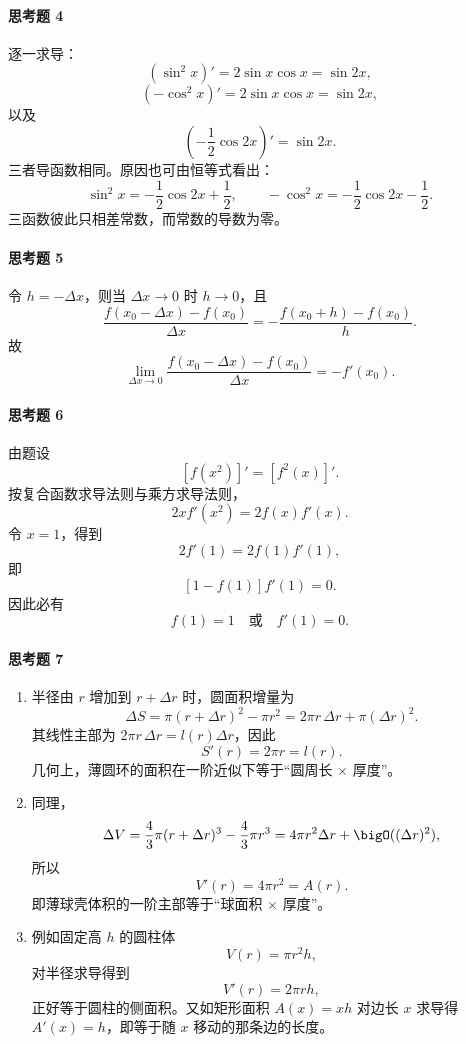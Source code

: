 \paragraph{思考题 4}
\begin{xsolution}
逐一求导：
\[
  (\sin^2x)'=2\sin x\cos x=\sin2x,
\]
\[
  (-\cos^2x)'=2\sin x\cos x=\sin2x,
\]
以及
\[
  \left(-\frac12\cos2x\right)'=\sin2x.
\]
三者导函数相同。原因也可由恒等式看出：
\[
  \sin^2x=-\frac12\cos2x+\frac12,
  \qquad
  -\cos^2x=-\frac12\cos2x-\frac12.
\]
三函数彼此只相差常数，而常数的导数为零。
\end{xsolution}

\paragraph{思考题 5}
\begin{xsolution}
令 $h=-\Delta x$，则当 $\Delta x\to0$ 时 $h\to0$，且
\[
  \frac{f(x_0-\Delta x)-f(x_0)}{\Delta x}
  =-\frac{f(x_0+h)-f(x_0)}h.
\]
故
\[
  \lim_{\Delta x\to0}\frac{f(x_0-\Delta x)-f(x_0)}{\Delta x}
  =-f'(x_0).
\]
\end{xsolution}

\paragraph{思考题 6}
\begin{xsolution}
由题设
\[
  [f(x^2)]'=[f^2(x)]'.
\]
按复合函数求导法则与乘方求导法则，
\[
  2x f'(x^2)=2f(x)f'(x).
\]
令 $x=1$，得到
\[
  2f'(1)=2f(1)f'(1),
\]
即
\[
  [1-f(1)]f'(1)=0.
\]
因此必有
\[
  \boxed{f(1)=1\quad\text{或}\quad f'(1)=0}.
\]
\end{xsolution}

\paragraph{思考题 7}
\begin{xsolution}
\begin{enumerate}[label=(\arabic*)]
  \item 半径由 $r$ 增加到 $r+\Delta r$ 时，圆面积增量为
  \[
    \Delta S=\pi(r+\Delta r)^2-\pi r^2
    =2\pi r\,\Delta r+\pi(\Delta r)^2.
  \]
  其线性主部为 $2\pi r\,\Delta r=l(r)\Delta r$，因此
  \[
    S'(r)=2\pi r=l(r).
  \]
  几何上，薄圆环的面积在一阶近似下等于“圆周长 $\times$ 厚度”。

  \item 同理，
  \[
    \Delta V=\frac43\pi(r+\Delta r)^3-\frac43\pi r^3
    =4\pi r^2\Delta r+\bigO((\Delta r)^2),
  \]
  所以
  \[
    V'(r)=4\pi r^2=A(r).
  \]
  即薄球壳体积的一阶主部等于“球面积 $\times$ 厚度”。

  \item 例如固定高 $h$ 的圆柱体
  \[
    V(r)=\pi r^2h,
  \]
  对半径求导得到
  \[
    V'(r)=2\pi rh,
  \]
  正好等于圆柱的侧面积。又如矩形面积 $A(x)=xh$ 对边长 $x$ 求导得 $A'(x)=h$，即等于随 $x$ 移动的那条边的长度。
\end{enumerate}
\end{xsolution}

